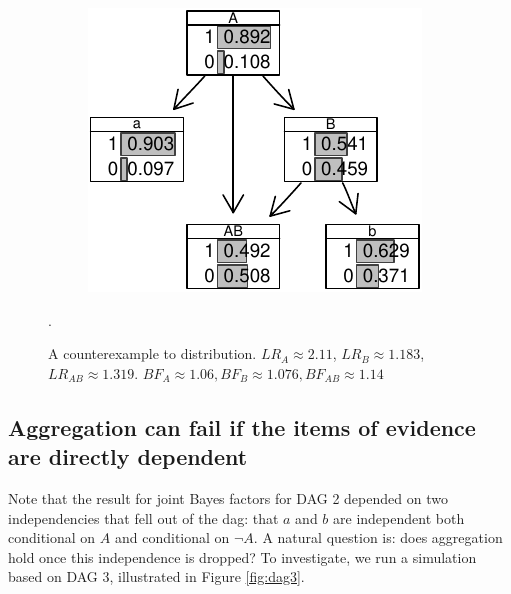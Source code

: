 \documentclass[
  10pt,
  dvipsnames,enabledeprecatedfontcommands]{scrartcl}
\newcommand{\n}{\neg}
\begin{document}
\begin{figure}
{\begin{subfigure}[!ht]{0.45\textwidth}
\begin{center}\includegraphics[width=1\linewidth]{conjunction-appendix12_files/figure-latex/unnamed-chunk-24-1} \end{center}
\end{subfigure}} 
\caption{A counterexample to distribution. $LR_A  \approx 2.11$, $LR_B \approx 1.183$,  $LR_{AB} \approx 1.319$. $BF_A \approx  1.06, BF_B \approx  1.076, BF_{AB}\approx   1.14$}.
\label{tab:CPTconjunctionBNL}
\end{figure}

\hypertarget{aggregation-can-fail-if-the-items-of-evidence-are-directly-dependent}{%
\subsection*{Aggregation can fail if the items of evidence are directly
dependent}\label{aggregation-can-fail-if-the-items-of-evidence-are-directly-dependent}}

Note that the result for joint Bayes factors for \textsf{DAG 2} depended
on two independencies that fell out of the dag: that \(a\) and \(b\) are
independent both conditional on \(A\) and conditional on \(\n A\). A
natural question is: does aggregation hold once this independence is
dropped? To investigate, we run a simulation based on \textsf{DAG 3},
illustrated in Figure \ref{fig:dag3}.
\end{document}
